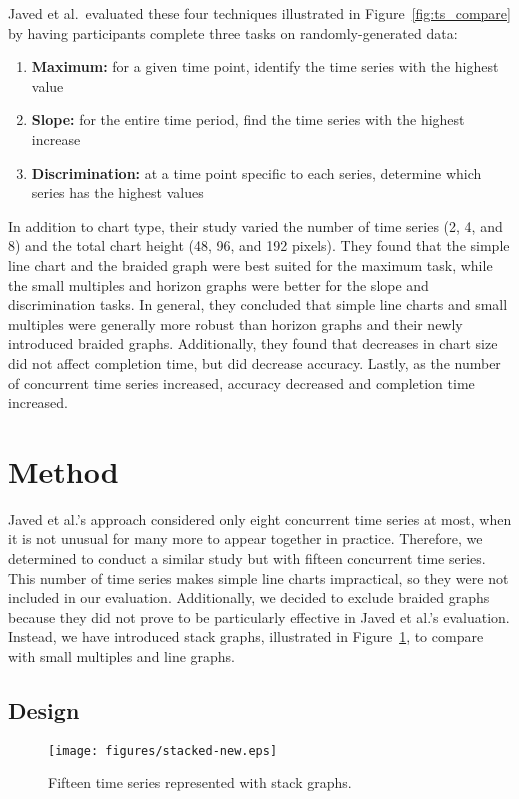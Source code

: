 \documentclass{article}
\begin{document}
Javed et al.\ evaluated these four techniques illustrated in Figure~\ref{fig:ts_compare} by having participants complete three tasks on randomly-generated data:
\begin{enumerate}
	\item \textbf{Maximum:} for a given time point, identify the time series with the highest value
	\item \textbf{Slope:} for the entire time period, find the time series with the highest increase
	\item \textbf{Discrimination:} at a time point specific to each series, determine which series has the highest values
\end{enumerate}
In addition to chart type, their study varied the number of time series (2, 4, and 8) and the total chart height (48, 96, and 192 pixels).  They found that the simple line chart and the braided graph were best suited for the maximum task, while the small multiples and horizon graphs were better for the slope and discrimination tasks.  In general, they concluded that simple line charts and small multiples were generally more robust than horizon graphs and their newly introduced braided graphs. Additionally, they found that decreases in chart size did not affect completion time, but did decrease accuracy.  Lastly, as the number of concurrent time series increased, accuracy decreased and completion time increased. 

\section{Method}

Javed et al.'s approach considered only eight concurrent time series at most, when it is not unusual for many more to appear together in practice.  Therefore, we determined to conduct a similar study but with fifteen concurrent time series.  This number of time series makes simple line charts impractical, so they were not included in our evaluation.  Additionally, we decided to exclude braided graphs because they did not prove to be particularly effective in Javed et al.'s evaluation.  Instead, we have introduced stack graphs, illustrated in Figure~\ref{fig:stackedGraph}, to compare with small multiples and line graphs.  

\subsection{Design}

\begin{figure}[h]
	\centering
	\texttt{[image: figures/stacked-new.eps]}
	\caption{Fifteen time series represented with stack graphs.}
	\label{fig:stackedGraph}
\end{figure}
\end{document}
